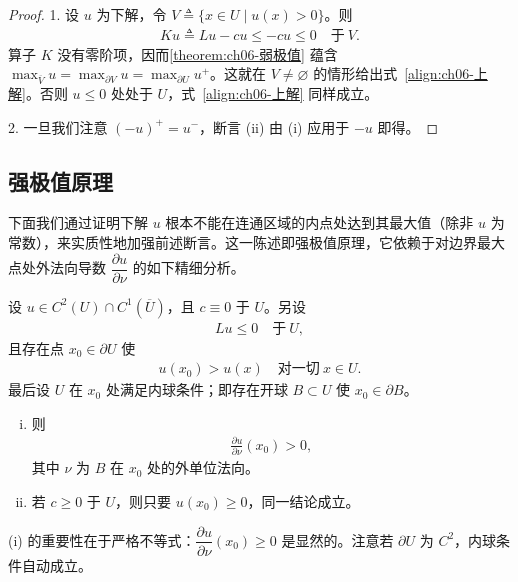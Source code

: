 \documentclass[../../main.tex]{subfiles}
\begin{document}
\begin{proof}
1. 设 $u$ 为下解，令 $V\triangleq\{x\in U\mid u(x)>0\}$。则
\begin{align*}
Ku\triangleq Lu-cu\leqslant-cu\leqslant 0\quad\text{于}\ V.
\end{align*}
算子 $K$ 没有零阶项，因而\cref{theorem:ch06-弱极值} 蕴含 $\max_{\overline{V}}u=\max_{\partial V}u=\max_{\partial U}u^{+}$。这就在 $V\neq\varnothing $ 的情形给出式~\eqref{align:ch06-上解}。否则 $u\leqslant 0$ 处处于 $U$，式~\eqref{align:ch06-上解} 同样成立。

2. 一旦我们注意 $(-u)^{+}=u^{-}$，断言 (ii) 由 (i) 应用于 $-u$ 即得。
\end{proof}

\subsection{强极值原理}\label{subsection:ch06-强极值}

下面我们通过证明下解 $u$ 根本不能在连通区域的内点处达到其最大值（除非 $u$ 为常数），来实质性地加强前述断言。这一陈述即强极值原理，它依赖于对边界最大点处外法向导数 $\dfrac{\partial u}{\partial\nu}$ 的如下精细分析。

\begin{lemma}[Hopf 引理]\label{lemma:ch06-Hopf}设 $u\in C^{2}(U)\cap C^{1}(\overline{U})$，且 $c\equiv 0$ 于 $U$。另设
\begin{align*}
Lu\leqslant 0\quad\text{于}\ U,
\end{align*}
且存在点 $x_{0}\in\partial U$ 使
\begin{align}
u(x_{0})>u(x)\quad\text{对一切}\ x\in U.
\end{align}
最后设 $U$ 在 $x_{0}$ 处满足内球条件；即存在开球 $B\subset U$ 使 $x_{0}\in\partial B$。
\begin{enumerate}[(i)]
\item 则
\begin{align*}
\frac{\partial u}{\partial\nu}(x_{0})>0,
\end{align*}
其中 $\nu$ 为 $B$ 在 $x_{0}$ 处的外单位法向。
\item 若 $c\geqslant 0$ 于 $U$，则只要 $u(x_{0})\geqslant 0$，同一结论成立。
\end{enumerate}
\end{lemma}

(i) 的重要性在于严格不等式：$\dfrac{\partial u}{\partial\nu}(x_{0})\geqslant 0$ 是显然的。注意若 $\partial U$ 为 $C^{2}$，内球条件自动成立。
\end{document}
